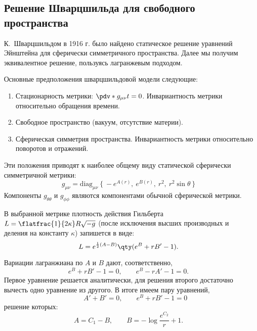 \documentclass[\docroot/reports/draft/report.tex]{subfiles}
\begin{document}
\onlyinsubfile{\tableofcontents}

\subsection{Решение Шварцшильда для свободного пространства}

    К.~Шварцшильдом в 1916 г. было найдено статическое решение уравнений Эйнштейна для сферически симметричного пространства. Далее мы получим эквивалентное решение, пользуясь лагранжевым подходом.

    Основные предположения шварцшильдовой модели следующие:
    \begin{enumerate}
        \item Стационарность метрики: $\pdv*{g_{\mu\nu}}{t} = 0$. Инвариантность метрики относительно обращения времени.
        \item Свободное пространство (вакуум, отсутствие материи).
        \item Сферическая симметрия пространства. Инвариантность метрики относительно поворотов и отражений.
    \end{enumerate}
    Эти положения приводят к наиболее общему виду статической сферически симметричной метрики:
    \begin{equation*}
        g_{\mu\nu} = \text{diag}_{\mu\nu}\ \{\ -e^{A(r)},\ e^{B(r)},\ r^2,\ r^2 \sin\theta \ \}
    \end{equation*}
    Компоненты $g_{\theta\theta}$ и $g_{\phi\phi}$ являются компонентами обычной сферической метрики.

    В выбранной метрике плотность действия Гильберта $L = \flatfrac{1}{2 \kappa} R \sqrt{-g}$ (после исключения высших производных и деления на константу $\kappa$) запишется в виде:
    \begin{equation*}
        L = e^{\frac{1}{2} (A - B)} \qty(e^B + r B' - 1) .
    \end{equation*}

    Вариации лагранжиана по $A$ и $B$ дают, соответственно,
    \begin{equation*}
        e^B + r B' - 1 = 0 , \qquad e^B - r A' - 1 = 0 .
    \end{equation*}
    Первое уравнение решается аналитически, для решения второго достаточно вычесть одно уравнение из другого. В итоге имеем пару уравнений,
    \begin{equation*}
        \qquad A' + B' = 0 , \qquad e^B + r B' - 1 = 0
    \end{equation*}
    решение которых:
    \begin{equation*}
        A = C_1 - B , \qquad B = - \log{\frac{e^{C_2}}{r} + 1} .
    \end{equation*}
\end{document}
